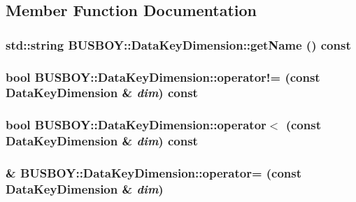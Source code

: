 \subsection{Member Function Documentation}
\hypertarget{classBUSBOY_1_1DataKeyDimension_ae70e88293f4f5d7820c64cf28096d836}{
\subsubsection[{getName}]{\setlength{\rightskip}{0pt plus 5cm}std::string BUSBOY::DataKeyDimension::getName () const}}
\label{classBUSBOY_1_1DataKeyDimension_ae70e88293f4f5d7820c64cf28096d836}
\hypertarget{classBUSBOY_1_1DataKeyDimension_a19bf1663b00cadf57cc91dd4ed634719}{
\subsubsection[{operator!=}]{\setlength{\rightskip}{0pt plus 5cm}bool BUSBOY::DataKeyDimension::operator!= (const {\bf DataKeyDimension} \& {\em dim}) const}}
\label{classBUSBOY_1_1DataKeyDimension_a19bf1663b00cadf57cc91dd4ed634719}
\hypertarget{classBUSBOY_1_1DataKeyDimension_ae1772070bdb199c17250971749d99c53}{
\subsubsection[{operator$<$}]{\setlength{\rightskip}{0pt plus 5cm}bool BUSBOY::DataKeyDimension::operator$<$ (const {\bf DataKeyDimension} \& {\em dim}) const}}
\label{classBUSBOY_1_1DataKeyDimension_ae1772070bdb199c17250971749d99c53}
\hypertarget{classBUSBOY_1_1DataKeyDimension_a557e765ae27d18960aca52a00cc84e3a}{
\subsubsection[{operator=}]{ \& BUSBOY::DataKeyDimension::operator= (const {\bf DataKeyDimension} \& {\em dim})}}
